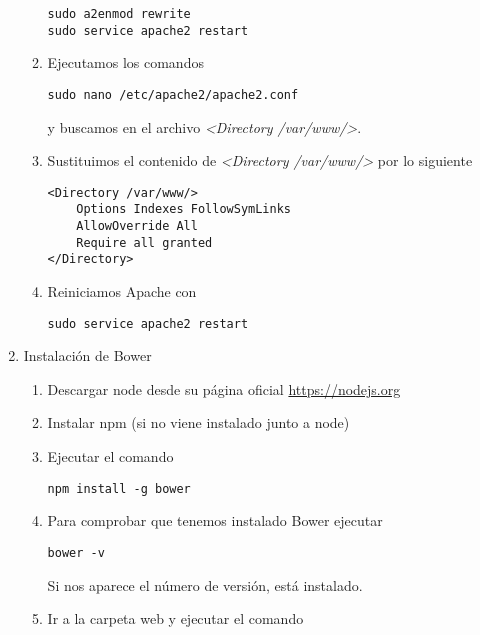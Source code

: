 \begin{enumerate}
\begin{enumerate}
\begin{verbatim}
sudo a2enmod rewrite
sudo service apache2 restart
\end{verbatim}


\item Ejecutamos los comandos

\begin{verbatim}
sudo nano /etc/apache2/apache2.conf
\end{verbatim}

y buscamos en el archivo \emph{<Directory /var/www/>}.

\item Sustituimos el contenido de \emph{<Directory /var/www/>} por lo siguiente

\begin{verbatim}
<Directory /var/www/>
	Options Indexes FollowSymLinks
	AllowOverride All
	Require all granted
</Directory>
\end{verbatim}

\item Reiniciamos Apache con

\begin{verbatim}
sudo service apache2 restart
\end{verbatim}

\end{enumerate}

\item Instalación de Bower

\begin{enumerate}
\item Descargar node desde su página oficial \url{https://nodejs.org}
\item Instalar npm (si no viene instalado junto a node)
\item Ejecutar el comando 

\begin{verbatim}
npm install -g bower
\end{verbatim}

\item Para comprobar que tenemos instalado Bower ejecutar 

\begin{verbatim}
bower -v
\end{verbatim} 

Si nos aparece el número de versión, está instalado.

\item Ir a la carpeta web y ejecutar el comando 


\end{enumerate}
\end{enumerate}
